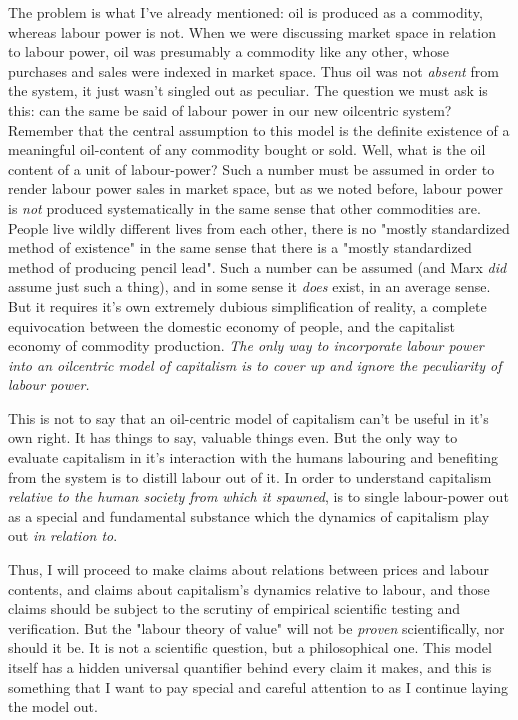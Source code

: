 The problem is what I've already mentioned: oil is produced as a commodity, whereas labour power is not. When we were discussing market space in relation to labour power, oil was presumably a commodity like any other, whose purchases and sales were indexed in market space. Thus oil was not \textit{absent} from the system, it just wasn't singled out as peculiar. The question we must ask is this: can the same be said of labour power in our new oilcentric system? Remember that the central assumption to this model is the definite existence of a meaningful oil-content of any commodity bought or sold. Well, what is the oil content of a unit of labour-power? Such a number must be assumed in order to render labour power sales in market space, but as we noted before, labour power is \textit{not} produced systematically in the same sense that other commodities are. People live wildly different lives from each other, there is no "mostly standardized method of existence" in the same sense that there is a "mostly standardized method of producing pencil lead". Such a number can be assumed (and Marx \textit{did} assume just such a thing), and in some sense it \textit{does} exist, in an average sense. But it requires it's own extremely dubious simplification of reality, a complete equivocation between the domestic economy of people, and the capitalist economy of commodity production. \textit{The only way to incorporate labour power into an oilcentric model of capitalism is to cover up and ignore the peculiarity of labour power.} \par 
This is not to say that an oil-centric model of capitalism can't be useful in it's own right. It has things to say, valuable things even. But the only way to evaluate capitalism in it's interaction with the humans labouring and benefiting from the system is to distill labour out of it. In order to understand capitalism \textit{relative to the human society from which it spawned}, is to single labour-power out as a special and fundamental substance which the dynamics of capitalism play out \textit{in relation to}. \par 
Thus, I will proceed to make claims about relations between prices and labour contents, and claims about capitalism's dynamics relative to labour, and those claims should be subject to the scrutiny of empirical scientific testing and verification. But the "labour theory of value" will not be \textit{proven} scientifically, nor should it be. It is not a scientific question, but a philosophical one. This model itself has a hidden universal quantifier behind every claim it makes, and this is something that I want to pay special and careful attention to as I continue laying the model out. \par 

